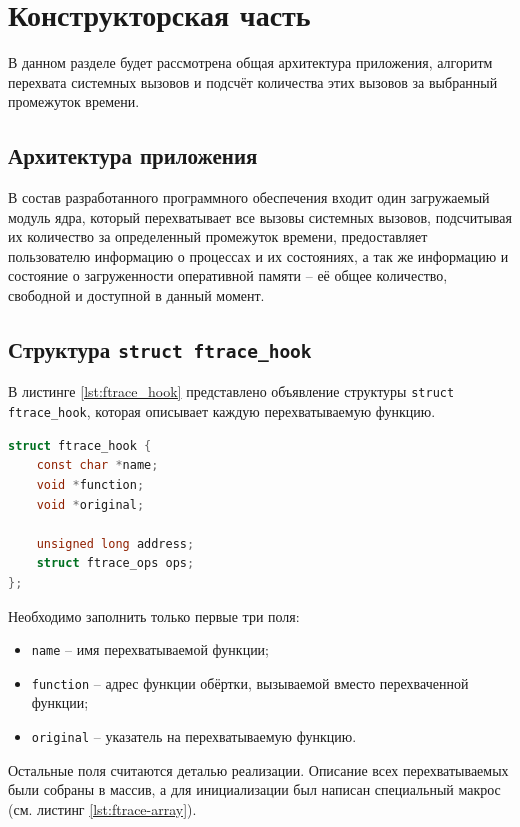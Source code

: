 \chapter{Конструкторская часть}

В данном разделе будет рассмотрена общая архитектура приложения, алгоритм перехвата системных вызовов и подсчёт количества этих вызовов за выбранный промежуток времени.

\section{Архитектура приложения}

В состав разработанного программного обеспечения входит один загружаемый модуль ядра, который перехватывает все вызовы системных вызовов, подсчитывая их количество за определенный промежуток времени, предоставляет пользователю информацию о процессах и их состояниях, а так же информацию и состояние о загруженности оперативной памяти -- её общее количество, свободной и доступной в данный момент.

\section{Структура \texttt{struct ftrace\_hook}}

В листинге \ref{lst:ftrace_hook} представлено объявление структуры \texttt{struct ftrace\_hook}, которая описывает каждую перехватываемую функцию.\\

\begin{lstlisting}[label=lst:ftrace_hook, caption=Листинг структуры ftrace\_hook, language=c]
struct ftrace_hook {
	const char *name;
	void *function;
	void *original;
	
	unsigned long address;
	struct ftrace_ops ops;
};
\end{lstlisting}

Необходимо заполнить только первые три поля:

\begin{itemize}
	\item \texttt{name} -- имя перехватываемой функции;
	\item \texttt{function} -- адрес функции обёртки, вызываемой вместо перехваченной функции;
	\item \texttt{original} -- указатель на перехватываемую функцию.
\end{itemize}

Остальные поля считаются деталью реализации. Описание всех перехватываемых были собраны в массив, а для инициализации был написан специальный макрос (см. листинг \ref{lst:ftrace-array}).\\

